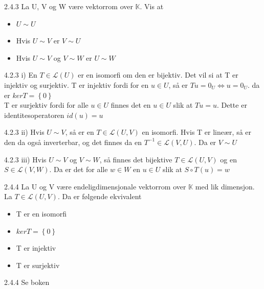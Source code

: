 \documentclass[a4paper,norsk]{article}
\begin{document}
\begin{oppgavebox}{2.4.3}{}
La U, V og W være vektorrom over $ \mathbb{K} $. Vis at 
\begin{itemize}
  \item $ U \sim U $ 
  \item Hvis $ U \sim V $ er $ V \sim U $ 
  \item Hvis $ U \sim V  $ og $ V \sim W $  er $ U \sim W $ 
\end{itemize}

\begin{proofbox}{4.2.3 i)}{}
En $ T \in \mathcal{L} \left( U \right)  $ er en isomorfi om den er bijektiv. Det vil si at T er injektiv og surjektiv. 
T er injektiv fordi for en $ u \in  U $, så er $ Tu = 0_U \iff u = 0_U $. da er $ ker T = \left\{ 0 \right\}  $ \\

T er surjektiv fordi for alle $ u \in  U $ finnes det en $ u \in U $ slik at $ Tu = u $. Dette er identitesoperatoren $ id \left( u \right) =u  $ 
\end{proofbox}

\begin{proofbox}{4.2.3 ii)}{}
Hvis $ U \sim V $, så er en $ T \in \mathcal{L} \left( U, V \right)  $ en isomorfi. Hvis T er lineær, så er den da også inverterbar, og det finnes da en $ T^{-1} \in \mathcal{L} \left( V, U \right)  $. Da er $ V \sim U $ 
\end{proofbox}

\begin{proofbox}{4.2.3 iii)}{}
Hvis $ U \sim V $ og $ V \sim W $, så finnes det bijektive $ T \in  \mathcal{L} \left( U, V \right)  $ og en $ S \in \mathcal{L} \left( V, W \right)  $. Da er det for alle $ w \in W $ en $ u \in  U $ slik at $ S \circ T \left( u \right) = w $ 
\end{proofbox}
\end{oppgavebox}

\begin{theorembox}{2.4.4}{}
La U og V være endeligdimensjonale vektorrom over $ \mathbb{K} $ med lik dimensjon. La $ T \in \mathcal{L} \left( U, V \right)  $. Da er følgende ekvivalent
\begin{itemize}
  \item T er en isomorfi
  \item $ ker T = \left\{ 0 \right\}  $ 
  \item T er injektiv
  \item T er surjektiv 
\end{itemize}
\begin{proofbox}{2.4.4}{}
Se boken
\end{proofbox}
\end{theorembox}
\end{document}
